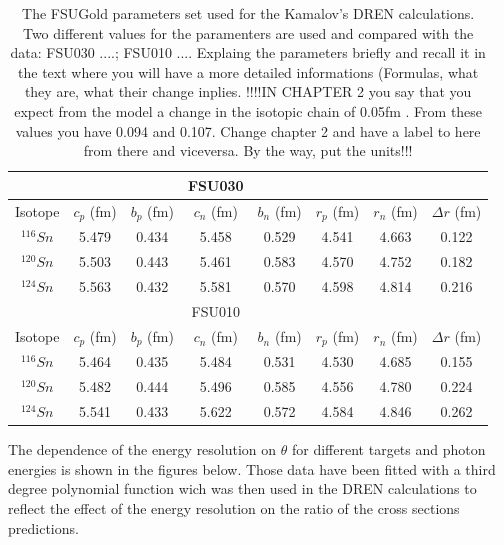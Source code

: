 \newcommand{\rastrech}[1]{\renewcommand{\arraystretch}{#1}}
\begin{table}[ht]
\rastrech{1.5}
\centering
\begin{tabular}{|c | c c c c c c c |}
\hline\hline
 & & &  FSU030 & & & &  \\
\hline
Isotope & $c_{p}$ (fm) &$b_{p}$ (fm) & $c_{n}$ (fm) & $b_{n}$ (fm) & $r_{p}$ (fm) & $r_{n}$ (fm) & $\Delta r$ (fm) \\
$^{116}Sn$ & 5.479 & 0.434 & 5.458 & 0.529 & 4.541 & 4.663  & 0.122\\
$^{120}Sn$ & 5.503 & 0.443 & 5.461 & 0.583 & 4.570 & 4.752  & 0.182\\
$^{124}Sn$ & 5.563 & 0.432 & 5.581 & 0.570 & 4.598 & 4.814  & 0.216\\
\hline\hline
 & & &  FSU010 & & &  &\\
\hline
Isotope & $c_{p}$ (fm) &$b_{p}$ (fm) & $c_{n}$ (fm) & $b_{n}$ (fm) & $r_{p}$ (fm) & $r_{n}$ (fm) & $\Delta r$ (fm) \\
$^{116}Sn$ & 5.464 & 0.435 & 5.484 & 0.531 & 4.530 & 4.685 & 0.155\\
$^{120}Sn$ & 5.482 & 0.444 & 5.496 & 0.585 & 4.556 & 4.780 & 0.224\\
$^{124}Sn$ & 5.541 & 0.433 & 5.622 & 0.572 & 4.584 & 4.846 & 0.262\\
\hline\hline
\end{tabular}
\caption{The FSUGold parameters set used for the Kamalov's DREN calculations. Two different values for the paramenters are used and compared with the data: FSU030 ....; FSU010 ....  Explaing the parameters briefly and recall it in the text where you will have a more detailed informations (Formulas, what they are, what their change inplies. 
!!!!IN CHAPTER 2 you say that you expect from the model a change in the isotopic chain of 0.05fm . From these values  you have 0.094 and 0.107. Change chapter 2 and have a label to here from there and viceversa. By the way, put the units!!! }
\label{fsu_table}
\end{table} 

\indent The dependence of the energy resolution on $\theta$ for different targets and photon energies is shown in the figures below. Those data have been fitted with a third degree polynomial function wich was then used in the DREN calculations to reflect the effect of the energy resolution on the ratio of the cross sections predictions.

